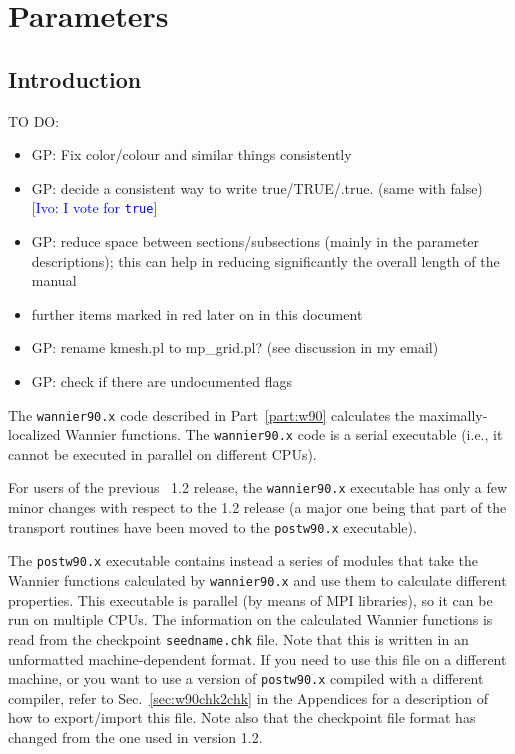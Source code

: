 \chapter{Parameters}

\section{Introduction}
{\color{red}
TO DO:
\begin{itemize}
\item GP: Fix color/colour and similar things consistently
\item GP: decide a consistent way to write true/TRUE/.true. (same with
  false) \textcolor{blue}{[Ivo: I vote for {\tt true}]}
\item GP: reduce space between sections/subsections (mainly in the
  parameter descriptions); this can help in reducing significantly the
  overall length of the manual
\item further items marked in red later on in this document
\item GP: rename kmesh.pl to mp\_grid.pl? (see discussion in my email)
\item GP: check if there are undocumented flags
\end{itemize}
}

The \texttt{wannier90.x} code described in Part~\ref{part:w90}
calculates the maximally-localized Wannier functions. The \texttt{wannier90.x} code is a
serial executable (i.e., it cannot be executed in parallel on different
CPUs).

For users of the previous \wannier\ 1.2 release, the
\texttt{wannier90.x} executable has only a few minor changes with
respect to the 1.2 release (a major one being that part of the
transport routines have been moved to the \texttt{postw90.x}
executable).

The \texttt{postw90.x} executable contains instead a series of modules
that take the Wannier functions calculated by \texttt{wannier90.x} and
use them to calculate different properties.  This executable is
parallel (by means of MPI libraries), so it can be run on multiple
CPUs.  The information on the calculated Wannier functions is read
from the checkpoint \verb|seedname.chk| file. Note that this is
written in an unformatted machine-dependent format. If you need to use
this file on a different machine, or you want to use a version of
\texttt{postw90.x} compiled with a different compiler, refer to
Sec.~\ref{sec:w90chk2chk} in the Appendices for a description of how
to export/import this file. Note also that the checkpoint file format has
changed from the one used in version 1.2.

